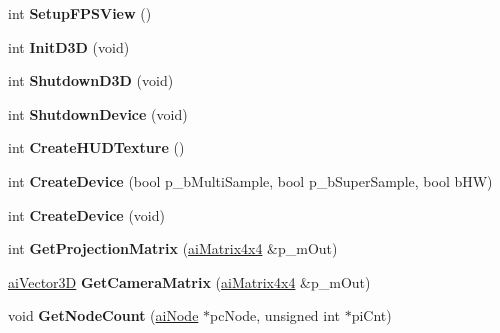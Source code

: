\begin{DoxyCompactItemize}
\item 
\hypertarget{namespace_assimp_view_adfda41073783d171b69091f0be6df1e4}{int {\bfseries Setup\+F\+P\+S\+View} ()}\label{namespace_assimp_view_adfda41073783d171b69091f0be6df1e4}

\item 
\hypertarget{namespace_assimp_view_a3f70b13268f17a259f58ecd8c8e1c17f}{int {\bfseries Init\+D3\+D} (void)}\label{namespace_assimp_view_a3f70b13268f17a259f58ecd8c8e1c17f}

\item 
\hypertarget{namespace_assimp_view_a18747430a74dd28bf552f46fce9b27e4}{int {\bfseries Shutdown\+D3\+D} (void)}\label{namespace_assimp_view_a18747430a74dd28bf552f46fce9b27e4}

\item 
\hypertarget{namespace_assimp_view_a00af866ed06a26243da2e5de3c338174}{int {\bfseries Shutdown\+Device} (void)}\label{namespace_assimp_view_a00af866ed06a26243da2e5de3c338174}

\item 
\hypertarget{namespace_assimp_view_ad030a184f1fc2b77b810c4ccbbbc07a9}{int {\bfseries Create\+H\+U\+D\+Texture} ()}\label{namespace_assimp_view_ad030a184f1fc2b77b810c4ccbbbc07a9}

\item 
\hypertarget{namespace_assimp_view_a32b58627cff2ea792777a62b34f5134f}{int {\bfseries Create\+Device} (bool p\+\_\+b\+Multi\+Sample, bool p\+\_\+b\+Super\+Sample, bool b\+H\+W)}\label{namespace_assimp_view_a32b58627cff2ea792777a62b34f5134f}

\item 
\hypertarget{namespace_assimp_view_accb15a432e5f8c964e435e34d9fed591}{int {\bfseries Create\+Device} (void)}\label{namespace_assimp_view_accb15a432e5f8c964e435e34d9fed591}

\item 
\hypertarget{namespace_assimp_view_a16f425d5dd5706afbbe41d10e4359125}{int {\bfseries Get\+Projection\+Matrix} (\hyperlink{structai_matrix4x4}{ai\+Matrix4x4} \&p\+\_\+m\+Out)}\label{namespace_assimp_view_a16f425d5dd5706afbbe41d10e4359125}

\item 
\hypertarget{namespace_assimp_view_ae7be73bd02596d503e5f485eea58c224}{\hyperlink{structai_vector3_d}{ai\+Vector3\+D} {\bfseries Get\+Camera\+Matrix} (\hyperlink{structai_matrix4x4}{ai\+Matrix4x4} \&p\+\_\+m\+Out)}\label{namespace_assimp_view_ae7be73bd02596d503e5f485eea58c224}

\item 
\hypertarget{namespace_assimp_view_acbf92f690a2b741806969d7e82ed954f}{void {\bfseries Get\+Node\+Count} (\hyperlink{structai_node}{ai\+Node} $\ast$pc\+Node, unsigned int $\ast$pi\+Cnt)}\label{namespace_assimp_view_acbf92f690a2b741806969d7e82ed954f}


\end{DoxyCompactItemize}
